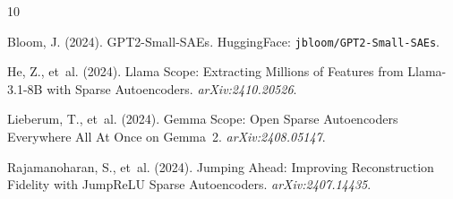 \documentclass[11pt,a4paper]{article}
\begin{document}
\newpage

\begin{thebibliography}{10}

Bloom, J. (2024).
\newblock GPT2-Small-SAEs.
\newblock HuggingFace: \texttt{jbloom/GPT2-Small-SAEs}.

He, Z., et~al. (2024).
\newblock Llama Scope: Extracting Millions of Features from Llama-3.1-8B
  with Sparse Autoencoders.
\newblock \emph{arXiv:2410.20526}.

Lieberum, T., et~al. (2024).
\newblock Gemma Scope: Open Sparse Autoencoders Everywhere All At Once on
  Gemma~2.
\newblock \emph{arXiv:2408.05147}.

Rajamanoharan, S., et~al. (2024).
\newblock Jumping Ahead: Improving Reconstruction Fidelity with JumpReLU
  Sparse Autoencoders.
\newblock \emph{arXiv:2407.14435}.

\end{thebibliography}
\end{document}
